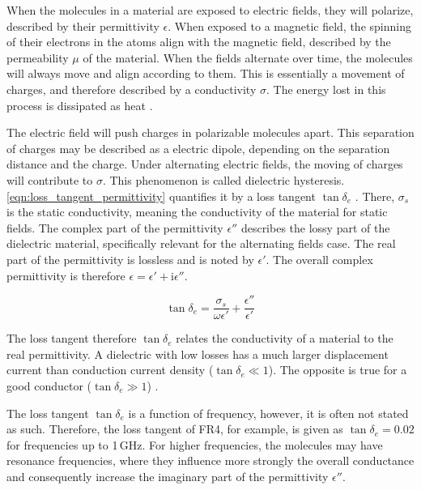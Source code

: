 

When the molecules in a material are exposed to electric fields, they will polarize, described by their permittivity $\epsilon$. When exposed to a magnetic field, the spinning of their electrons in the atoms align with the magnetic field, described by the permeability $\mu$ of the material. When the fields alternate over time, the molecules will always move and align according to them. This is essentially a movement of charges, and therefore described by a conductivity $\sigma$. The energy lost in this process is dissipated as heat \cite{Balanis_2012}.

The electric field will push charges in polarizable molecules apart. This separation of charges may be described as a electric dipole, depending on the separation distance and the charge. Under alternating electric fields, the moving of charges will contribute to $\sigma$. This phenomenon is called dielectric hysteresis. \autoref{eqn:loss_tangent_permittivity} quantifies it by a loss tangent $\tan\delta_e$ \cite{Balanis_2012}. There, $\sigma_s$ is the static conductivity, meaning the conductivity of the material for static fields. The complex part of the permittivity $\epsilon''$ describes the lossy part of the dielectric material, specifically relevant for the alternating fields case. The real part of the permittivity is lossless and is noted by $\epsilon'$. The overall complex permittivity is therefore $\epsilon=\epsilon'+\mathrm{i}\epsilon''$.

\begin{equation}
    \tan\delta_e = \frac{\sigma_s}{\omega\epsilon'}+\frac{\epsilon''}{\epsilon'}
    \label{eqn:loss_tangent_permittivity}
\end{equation}

The loss tangent therefore $\tan\delta_e$ relates the conductivity of a material to the real permittivity. A dielectric with low losses has a much larger displacement current than conduction current density ($\tan\delta_e \ll 1$). The opposite is true for a good conductor ($\tan\delta_e \gg 1$) \cite{Balanis_2012}.

The loss tangent $\tan\delta_e$ is a function of frequency, however, it is often not stated as such. Therefore, the loss tangent of FR4, for example, is given as $\tan\delta_e=0.02$ for frequencies up to 1\,GHz. For higher frequencies, the molecules may have resonance frequencies, where they influence more strongly the overall conductance and consequently increase the imaginary part of the permittivity $\epsilon''$.

